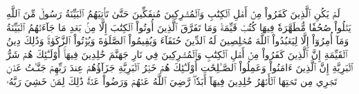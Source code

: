 لَمۡ يَكُنِ ٱلَّذِينَ كَفَرُواْ مِنۡ أَهۡلِ ٱلۡكِتَٰبِ وَٱلۡمُشۡرِكِينَ مُنفَكِّينَ حَتَّىٰ تَأۡتِيَهُمُ ٱلۡبَيِّنَةُ
رَسُولٞ مِّنَ ٱللَّهِ يَتۡلُواْ صُحُفٗا مُّطَهَّرَةٗ
فِيهَا كُتُبٞ قَيِّمَةٞ
وَمَا تَفَرَّقَ ٱلَّذِينَ أُوتُواْ ٱلۡكِتَٰبَ إِلَّا مِنۢ بَعۡدِ مَا جَآءَتۡهُمُ ٱلۡبَيِّنَةُ
وَمَآ أُمِرُوٓاْ إِلَّا لِيَعۡبُدُواْ ٱللَّهَ مُخۡلِصِينَ لَهُ ٱلدِّينَ حُنَفَآءَ وَيُقِيمُواْ ٱلصَّلَوٰةَ وَيُؤۡتُواْ ٱلزَّكَوٰةَۚ وَذَٰلِكَ دِينُ ٱلۡقَيِّمَةِ
إِنَّ ٱلَّذِينَ كَفَرُواْ مِنۡ أَهۡلِ ٱلۡكِتَٰبِ وَٱلۡمُشۡرِكِينَ فِي نَارِ جَهَنَّمَ خَٰلِدِينَ فِيهَآۚ أُوْلَـٰٓئِكَ هُمۡ شَرُّ ٱلۡبَرِيَّةِ
إِنَّ ٱلَّذِينَ ءَامَنُواْ وَعَمِلُواْ ٱلصَّـٰلِحَٰتِ أُوْلَـٰٓئِكَ هُمۡ خَيۡرُ ٱلۡبَرِيَّةِ
جَزَآؤُهُمۡ عِندَ رَبِّهِمۡ جَنَّـٰتُ عَدۡنٖ تَجۡرِي مِن تَحۡتِهَا ٱلۡأَنۡهَٰرُ خَٰلِدِينَ فِيهَآ أَبَدٗاۖ رَّضِيَ ٱللَّهُ عَنۡهُمۡ وَرَضُواْ عَنۡهُۚ ذَٰلِكَ لِمَنۡ خَشِيَ رَبَّهُۥ